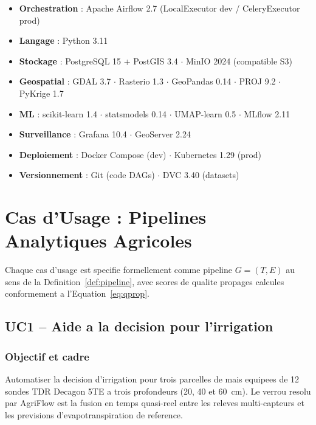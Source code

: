 \documentclass[12pt,a4paper]{article}
\theoremstyle{plain}
\theoremstyle{definition}
\theoremstyle{remark}
\begin{document}
\begin{resultbox}
\begin{itemize}[noitemsep,leftmargin=1.2em]
  \item \textbf{Orchestration} : Apache Airflow 2.7
    (LocalExecutor dev / CeleryExecutor prod)
  \item \textbf{Langage} : Python 3.11
  \item \textbf{Stockage} : PostgreSQL 15 + PostGIS 3.4 $\cdot$
    MinIO 2024 (compatible S3)
  \item \textbf{Geospatial} : GDAL 3.7 $\cdot$ Rasterio 1.3 $\cdot$
    GeoPandas 0.14 $\cdot$ PROJ 9.2 $\cdot$ PyKrige 1.7
  \item \textbf{ML} : scikit-learn 1.4 $\cdot$ statsmodels 0.14 $\cdot$
    UMAP-learn 0.5 $\cdot$ MLflow 2.11
  \item \textbf{Surveillance} : Grafana 10.4 $\cdot$ GeoServer 2.24
  \item \textbf{Deploiement} : Docker Compose (dev) $\cdot$
    Kubernetes 1.29 (prod)
  \item \textbf{Versionnement} : Git (code DAGs) $\cdot$
    DVC 3.40 (datasets)
\end{itemize}
\end{resultbox}

\section{Cas d'Usage : Pipelines Analytiques Agricoles}
\label{sec:usecases}

Chaque cas d'usage est specifie formellement comme pipeline
$G=(T,E)$ au sens de la Definition~\ref{def:pipeline}, avec
scores de qualite propages calcules conformement a
l'Equation~\eqref{eq:qprop}.

\subsection{UC1 -- Aide a la decision pour l'irrigation}
\label{subsec:uc1}

\subsubsection{Objectif et cadre}

Automatiser la decision d'irrigation pour trois parcelles de mais
equipees de 12 sondes TDR Decagon 5TE a trois profondeurs
(20, 40 et 60~cm). Le verrou resolu par AgriFlow est la fusion
en temps quasi-reel entre les releves multi-capteurs et les
previsions d'evapotranspiration de reference.
\end{document}
